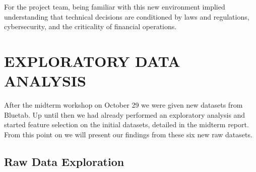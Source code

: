 \documentclass[12pt,a4paper]{report}
\begin{document}
For the project team, being familiar with this new environment implied understanding that technical decisions are conditioned by laws and regulations, cybersecurity, and the criticality of financial operations.

\chapter{EXPLORATORY DATA ANALYSIS}
After the midterm workshop on October 29 we were given new datasets from Bluetab. Up until then we had already performed an exploratory analysis and started feature selection on the initial datasets, detailed in the midterm report. From this point on we will present our findings from these six new raw datasets.

\section{Raw Data Exploration}
\end{document}
